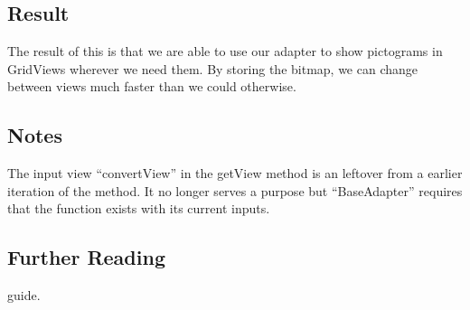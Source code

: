 \subsection*{Result}
The result of this is that we are able to use our adapter to show pictograms in GridViews wherever we need them.
By storing the bitmap, we can change between views much faster than we could otherwise.


\subsection*{Notes}
The input view ``convertView'' in the getView method is an leftover from a earlier iteration of the method. It no longer serves a purpose but ``BaseAdapter'' requires that the function exists with its current inputs.\\

\subsection*{Further Reading}
guide.